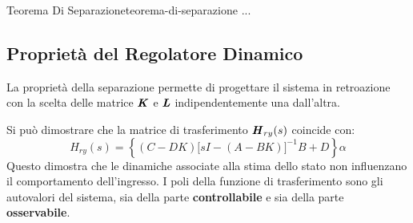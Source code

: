 \documentclass[12pt]{article}
\begin{document}
\begin{theorem}{Teorema Di Separazione}{teorema-di-separazione}
...
\end{theorem}

\subsection{Propriet\`a del Regolatore Dinamico}
La propriet\`a della separazione permette di progettare il sistema in retroazione con la scelta delle matrice $\textbf{\textit{K}}$ e $\textbf{\textit{L}}$ indipendentemente una dall'altra.

Si pu\`o dimostrare che la matrice di trasferimento $\textbf{\textit{H}} _{ry}(s)$ coincide con:
\[ H _{ry}(s) = \left\{ (C-DK) \big[ sI - (A-BK) \big]^{-1} B + D \right\}\alpha  \]
Questo dimostra che le dinamiche associate alla stima dello stato non influenzano il comportamento dell'ingresso.
I poli della funzione di trasferimento sono gli autovalori del sistema, sia della parte \textbf{controllabile} e sia della parte \textbf{osservabile}.



\newpage
\end{document}
